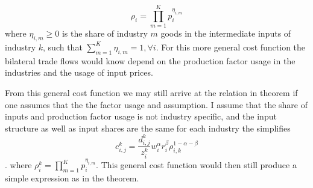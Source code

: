 \[\rho_{i}= \prod\limits_{m=1}^{K}  p^{\eta_{i,m}}_{i}  \] where $\eta_{i,m} \geq 0$ is the share of industry $m$ goods in the intermediate inputs of industry $k$, such that $\sum_{m=1}^K \eta_{i,m}=1, \forall i$.  For this more general cost function the bilateral trade flows would know depend on the production factor usage in the industries and the usage of input prices. \par From this general cost function we may still arrive at the relation in theorem if one assumes that the the factor usage and  assumption. I assume that the share of inputs and production factor usage is not industry specific, and the input structure as well as input shares are the same for each industry the simplifies \[ c^k_{i,j}=\frac{d^k_{i,j}}{z_{i}^k } w^{\alpha}_i r^{\beta}_i \rho^{1-\alpha-\beta}_{i,k} \]. where
$\rho^k_{i}= \prod\limits_{m=1}^{K}  p^{\eta_{i,m}}_{i}  $. This general cost function would then still produce a simple expression as in the theorem.
\endinput